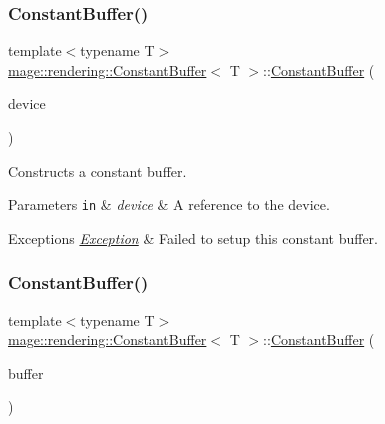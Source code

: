 \subsubsection{\texorpdfstring{Constant\+Buffer()}{ConstantBuffer()}\hspace{0.1cm}{\footnotesize\ttfamily [1/3]}}
{\footnotesize\ttfamily template$<$typename T$>$ \\
\mbox{\hyperlink{classmage_1_1rendering_1_1_constant_buffer}{mage\+::rendering\+::\+Constant\+Buffer}}$<$ T $>$\+::\mbox{\hyperlink{classmage_1_1rendering_1_1_constant_buffer}{Constant\+Buffer}} (\begin{DoxyParamCaption}\item[{I\+D3\+D11\+Device \&}]{device }\end{DoxyParamCaption})\hspace{0.3cm}{\ttfamily [explicit]}}

Constructs a constant buffer.


\begin{DoxyParams}[1]{Parameters}
\mbox{\tt in}  & {\em device} & A reference to the device. \\
\hline
\end{DoxyParams}

\begin{DoxyExceptions}{Exceptions}
{\em \mbox{\hyperlink{classmage_1_1_exception}{Exception}}} & Failed to setup this constant buffer. \\
\hline
\end{DoxyExceptions}
\mbox{\label{classmage_1_1rendering_1_1_constant_buffer_aacc1ace626cdf1fbeb2d51d7789495da}} 
\subsubsection{\texorpdfstring{Constant\+Buffer()}{ConstantBuffer()}\hspace{0.1cm}{\footnotesize\ttfamily [2/3]}}
{\footnotesize\ttfamily template$<$typename T$>$ \\
\mbox{\hyperlink{classmage_1_1rendering_1_1_constant_buffer}{mage\+::rendering\+::\+Constant\+Buffer}}$<$ T $>$\+::\mbox{\hyperlink{classmage_1_1rendering_1_1_constant_buffer}{Constant\+Buffer}} (\begin{DoxyParamCaption}\item[{const \mbox{\hyperlink{classmage_1_1rendering_1_1_constant_buffer}{Constant\+Buffer}}$<$ T $>$ \&}]{buffer }\end{DoxyParamCaption})\hspace{0.3cm}{\ttfamily [delete]}}

